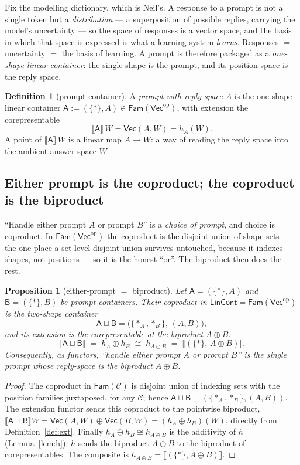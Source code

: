 \documentclass[11pt]{amsart}
\theoremstyle{plain}
\newtheorem{proposition}[theorem]{Proposition}
\theoremstyle{definition}
\newtheorem{definition}[theorem]{Definition}
\renewcommand{\Vec}{\mathsf{Vec}}
\newcommand{\LinCont}{\mathsf{LinCont}}
\newcommand{\Fam}{\mathsf{Fam}}
\newcommand{\op}{\mathrm{op}}
\newcommand{\ext}[1]{\llbracket #1 \rrbracket}
\newcommand{\iso}{\cong}
\begin{document}
Fix the modelling dictionary, which is Neil's. A response to a prompt is not a single
token but a \emph{distribution} --- a superposition of possible replies, carrying the
model's uncertainty --- so the space of responses is a vector space, and the basis in
which that space is expressed is what a learning system \emph{learns}. Responses $=$
uncertainty $=$ the basis of learning. A prompt is therefore packaged as a
\emph{one-shape linear container}: the single shape is the prompt, and its position
space is the reply space.

\begin{definition}[prompt container]\label{def:prompt}
A \emph{prompt with reply-space $A$} is the one-shape linear container
$\mathsf A:=(\{*\},A)\in\Fam(\Vec^\op)$, with extension the corepresentable
\[
  \ext{\mathsf A}\,W=\Vec(A,W)=h_A(W).
\]
A point of $\ext{\mathsf A}\,W$ is a linear map $A\to W$: a way of reading the reply
space into the ambient answer space $W$.
\end{definition}

\subsection{Either prompt is the coproduct; the coproduct is the biproduct}

``Handle either prompt $A$ or prompt $B$'' is a \emph{choice of prompt}, and choice is
coproduct. In $\Fam(\Vec^\op)$ the coproduct is the disjoint union of shape sets ---
the one place a set-level disjoint union survives untouched, because it indexes shapes,
not positions --- so it is the honest ``or''. The biproduct then does the rest.

\begin{proposition}[either-prompt $=$ biproduct]\label{prop:eitherprompt}
Let $\mathsf A=(\{*\},A)$ and $\mathsf B=(\{*\},B)$ be prompt containers. Their
coproduct in $\LinCont=\Fam(\Vec^\op)$ is the two-shape container
\[
  \mathsf A\sqcup\mathsf B=\bigl(\{*_A,*_B\},\,(A,B)\bigr),
\]
and its extension is the corepresentable at the biproduct $A\oplus B$:
\[
  \ext{\mathsf A\sqcup\mathsf B}
  \;=\;h_A\oplus h_B
  \;\iso\;h_{A\oplus B}
  \;=\;\ext{(\{*\},\,A\oplus B)}.
\]
Consequently, as functors, ``handle either prompt $A$ or prompt $B$'' is the
\emph{single} prompt whose reply-space is the biproduct $A\oplus B$.
\end{proposition}

\begin{proof}
The coproduct in $\Fam(\mathcal C)$ is disjoint union of indexing sets with the
position families juxtaposed, for any $\mathcal C$; hence
$\mathsf A\sqcup\mathsf B=(\{*_A,*_B\},(A,B))$. The extension functor sends this
coproduct to the pointwise biproduct,
$\ext{\mathsf A\sqcup\mathsf B}W=\Vec(A,W)\oplus\Vec(B,W)=(h_A\oplus h_B)(W)$,
directly from Definition~\ref{def:ext}. Finally $h_A\oplus h_B\iso h_{A\oplus B}$ is
the additivity of $h$ (Lemma~\ref{lem:h}): $h$ sends the biproduct $A\oplus B$ to the
biproduct of corepresentables. The composite is $h_{A\oplus B}=\ext{(\{*\},A\oplus
B)}$.
\end{proof}
\end{document}

